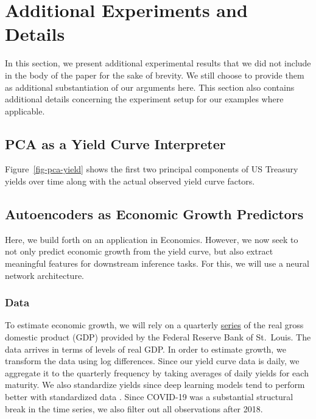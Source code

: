 \documentclass{article}
\theoremstyle{plain}
\theoremstyle{definition}
\theoremstyle{remark}
\begin{document}
\section{Additional Experiments and Details}\label{appendix:autoencoder}

In this section, we present additional experimental results that we did not include in the body of the paper for the sake of brevity. We still choose to provide them as additional substantiation of our arguments here. This section also contains additional details concerning the experiment setup for our examples where applicable. 

\subsection{PCA as a Yield Curve Interpreter}

Figure~\ref{fig-pca-yield} shows the first two principal components of US Treasury yields over time along with the actual observed yield curve factors.

\subsection{Autoencoders as Economic Growth Predictors}\label{example-deep-learning}


Here, we build forth on an application in Economics. However, we now seek to not only predict economic growth from the yield curve, but also extract meaningful features for downstream inference tasks. For this, we will use a neural network architecture.

\subsubsection{Data}\label{data}

To estimate economic growth, we will rely on a quarterly
\href{https://fred.stlouisfed.org/series/GDPC1}{series} of the real gross domestic product (GDP) provided by the Federal Reserve Bank of St.~Louis. The data arrives in terms of levels of real GDP. In order to estimate growth, we transform the data using log differences. Since
our yield curve data is daily, we aggregate it to the
quarterly frequency by taking averages of daily yields for each maturity. We also standardize yields since deep learning models tend to perform better with standardized data \cite{gal2019standardization}. Since COVID-19 was a substantial structural break in the time series, we also filter out all observations after 2018.
\end{document}
